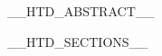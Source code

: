 \documentclass[UTF8,11pt,a4paper]{ctexart}
\title{\textbf{\htdtitle}}
\author{\normalsize \htdsubtitle}
\date{}
\begin{document}
\maketitle
__HTD_ABSTRACT__
\tableofcontents

__HTD_SECTIONS__
\end{document}
